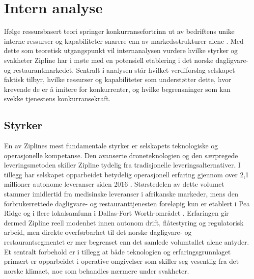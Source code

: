 \section{Intern analyse}

Ifølge ressursbasert teori springer konkurransefortrinn ut av bedriftens
unike interne ressurser og kapabiliteter snarere enn av markedsstrukturer
alene \parencite{barney1991}. Med dette som teoretisk utgangspunkt vil
internanalysen vurdere hvilke styrker og svakheter Zipline har i møte med en
potensiell etablering i det norske dagligvare- og restaurantmarkedet.
Sentralt i analysen står hvilket verdiforslag selskapet faktisk tilbyr,
hvilke ressurser og kapabiliteter som understøtter dette, hvor krevende de
er å imitere for konkurrenter, og hvilke begrensninger som kan svekke
tjenestens konkurransekraft.

\subsection{Styrker}

En av Ziplines mest fundamentale styrker er selskapets teknologiske og
operasjonelle kompetanse. Den avanserte droneteknologien og den særpregede
leveringsmetoden skiller Zipline tydelig fra tradisjonelle
leveringsalternativer. I tillegg har selskapet opparbeidet betydelig
operasjonell erfaring gjennom over 2,1 millioner autonome leveranser siden
2016 \parencite{ziplineabout}. Størstedelen av dette volumet stammer
imidlertid fra medisinske leveranser i afrikanske markeder, mens den
forbrukerrettede dagligvare- og restauranttjenesten foreløpig kun er
etablert i Pea Ridge og i flere lokalsamfunn i Dallas-Fort Worth-området
\parencite{ziplinefactsheet}. Erfaringen gir dermed Zipline reell modenhet
innen autonom drift, flåtestyring og
regulatorisk arbeid, men direkte overførbarhet til det norske dagligvare- og
restaurantsegmentet er mer begrenset enn det samlede volumtallet alene
antyder. Et sentralt forbehold er i tillegg at både teknologien og
erfaringsgrunnlaget primært er opparbeidet i operative omgivelser som
skiller seg vesentlig fra det norske klimaet, noe som behandles nærmere
under svakheter.


